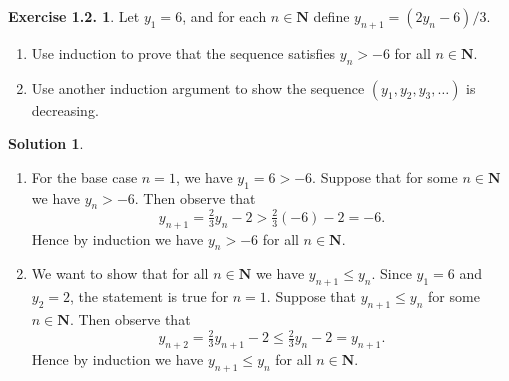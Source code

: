 \documentclass[12pt]{article}
\theoremstyle{definition}
\theoremstyle{exercise}
\newtheorem{exercise}{Exercise 1.2.}
\theoremstyle{solution}
\newtheorem*{solution}{Solution}
\begin{document}
\begin{exercise}
\label{ex:12}
    Let \( y_1 = 6 \), and for each \( n \in \mathbf{N} \) define \( y_{n+1} = (2y_n - 6)/3 \).
    \begin{enumerate}[label = (\alph*)]
        \item Use induction to prove that the sequence satisfies \( y_n > -6 \) for all \( n \in \mathbf{N} \).

        \item Use another induction argument to show the sequence \( (y_1, y_2, y_3, \ldots) \) is decreasing.
    \end{enumerate}
\end{exercise}

\begin{solution}
    \begin{enumerate}[label = (\alph*)]
        \item For the base case \( n = 1 \), we have \( y_1 = 6 > -6 \). Suppose that for some \( n \in \mathbf{N} \) we have \( y_n > -6 \). Then observe that
        \[
            y_{n+1} = \tfrac{2}{3} y_n - 2 > \tfrac{2}{3} (-6) - 2 = -6.
        \]
        Hence by induction we have \( y_n > -6 \) for all \( n \in \mathbf{N} \).

        \item We want to show that for all \( n \in \mathbf{N} \) we have \( y_{n+1} \leq y_n \). Since \( y_1 = 6 \) and \( y_2 = 2 \), the statement is true for \( n = 1 \). Suppose that \( y_{n+1} \leq y_n \) for some \( n \in \mathbf{N} \). Then observe that
        \[
            y_{n+2} = \tfrac{2}{3} y_{n+1} - 2 \leq \tfrac{2}{3} y_n - 2 = y_{n+1}.
        \]
        Hence by induction we have \( y_{n+1} \leq y_n \) for all \( n \in \mathbf{N} \).
    \end{enumerate}
\end{solution}
\end{document}
